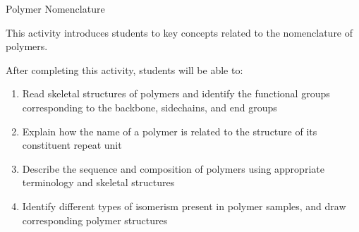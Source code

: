 %
%
%
%

\renewcommand{\figpath}{content/intro/nomenclature/figs}
\renewcommand{\labelbase}{nomenclature}

\begin{activity}{Polymer Nomenclature}

\begin{instructornotes}

	This activity introduces students to key concepts related to the nomenclature of polymers.
	
	After completing this activity, students will be able to:
			\begin{enumerate}
				\item Read skeletal structures of polymers and identify the functional groups corresponding to the backbone, sidechains, and end groups
				\item Explain how the name of a polymer is related to the structure of its constituent repeat unit
				\item Describe the sequence and composition of polymers using appropriate terminology and skeletal structures
				\item Identify different types of isomerism present in polymer samples, and draw corresponding polymer structures
			\end{enumerate}
			

\end{instructornotes}
\end{activity}
